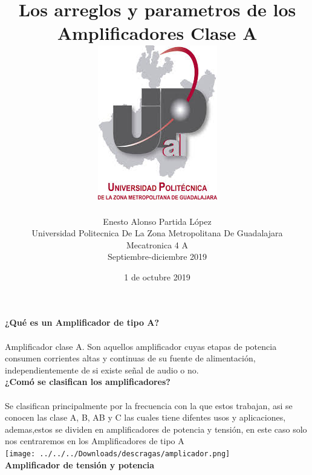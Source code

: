 \documentclass[12pt]{report}
\begin{document}
 
\title{\textbf{ Los arreglos y parametros de los Amplificadores Clase A\\\includegraphics[scale=0.5]{upzmg.jpg}}}
\author{Enesto Alonso Partida López\\ Universidad Politecnica De La Zona Metropolitana De Guadalajara\\ Mecatronica 4 A\\ Septiembre-diciembre 2019}

\date{1 de octubre 2019 }
\maketitle

\newpage
{\huge \textbf{¿Qué es un Amplificador de tipo A?}\\}\\


{\large Amplificador clase A. Son aquellos amplificador cuyas etapas de potencia consumen corrientes altas y continuas de su fuente de alimentación, independientemente de si existe señal de audio o no.}\\
 

{\huge \textbf{¿Comó se clasifican los amplificadores?}\\}\\


{\large Se clasifican principalmente por la frecuencia con la que estos trabajan, asi se conocen las clase A, B, AB y C las cuales tiene difentes usos y aplicaciones, ademas,estos se dividen en amplificadores de potencia y tensión, en este caso solo nos centraremos en los Amplificadores de tipo A}\\
\texttt{[image: ../../../Downloads/descragas/amplicador.png]}\\


{\huge \textbf{Amplificador de tensión y potencia}\\}\\
\end{document}
